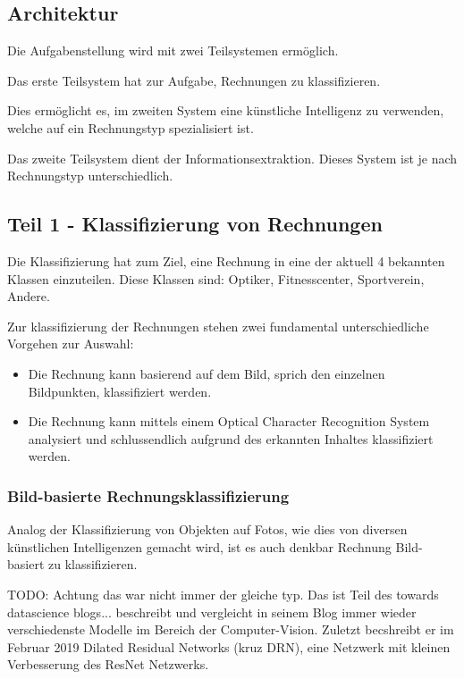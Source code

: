 \subsection{Architektur}

Die Aufgabenstellung wird mit zwei Teilsystemen ermöglich. 

Das erste Teilsystem hat zur Aufgabe, Rechnungen zu klassifizieren.

Dies ermöglicht es, im zweiten System eine künstliche Intelligenz zu verwenden, welche auf ein Rechnungstyp spezialisiert ist.

Das zweite Teilsystem dient der Informationsextraktion. Dieses System ist je nach Rechnungstyp unterschiedlich.

\subsection{Teil 1 - Klassifizierung von Rechnungen}

Die Klassifizierung hat zum Ziel, eine Rechnung in eine der aktuell 4 bekannten Klassen einzuteilen. Diese Klassen sind: Optiker, Fitnesscenter, Sportverein, Andere.

Zur klassifizierung der Rechnungen stehen zwei fundamental unterschiedliche Vorgehen zur Auswahl:

\begin{itemize}
    \item Die Rechnung kann basierend auf dem Bild, sprich den einzelnen Bildpunkten, klassifiziert werden.
    \item Die Rechnung kann mittels einem Optical Character Recognition System analysiert und schlussendlich aufgrund des erkannten Inhaltes klassifiziert werden.
\end{itemize}

\subsubsection{Bild-basierte Rechnungsklassifizierung}

Analog der Klassifizierung von Objekten auf Fotos, wie dies von diversen künstlichen Intelligenzen gemacht wird, ist es auch denkbar Rechnung Bild-basiert zu klassifizieren.

TODO: Achtung das war nicht immer der gleiche typ. Das ist Teil des towards datascience blogs...
\textcite{SHTsuang2019DRN} beschreibt und vergleicht in seinem Blog immer wieder verschiedenste Modelle im Bereich der Computer-Vision. Zuletzt becshreibt er im Februar 2019 Dilated Residual Networks (kruz DRN), eine Netzwerk mit kleinen Verbesserung des ResNet Netzwerks.

